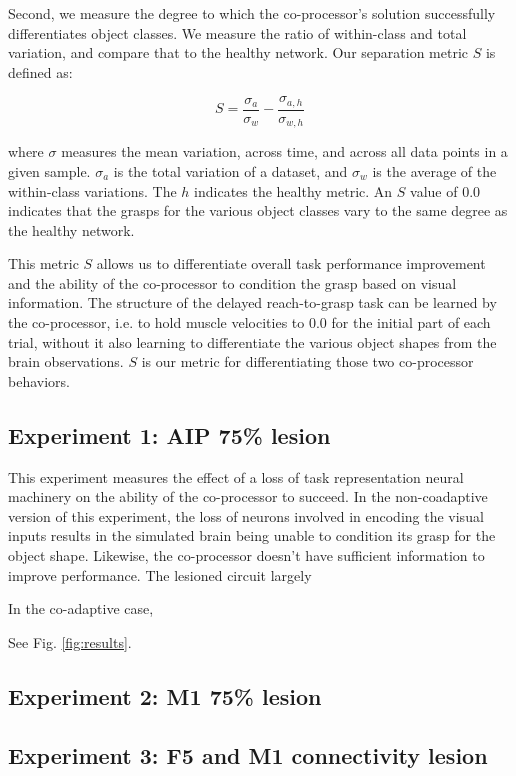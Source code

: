 \documentclass[12pt]{iopart}
\begin{document}
Second, we measure the degree to which the co-processor's solution successfully
differentiates object classes. We measure the ratio of within-class and total variation,
and compare that to the healthy network. Our separation metric $S$ is defined as:

\begin{equation}
	S = \frac{\sigma_{a}}{\sigma_{w}} - \frac{\sigma_{a,h}}{\sigma_{w,h}}
\end{equation}

where $\sigma$ measures the mean variation, across time, and across all data points in
a given sample. $\sigma_{a}$ is the total variation of a dataset, and $\sigma_{w}$
is the average of the within-class variations. The $h$ indicates the healthy
metric. An $S$ value of 0.0 indicates that the grasps for the various object classes
vary to the same degree as the healthy network.

This metric $S$ allows us to differentiate overall task performance improvement
and the ability of the co-processor to condition the grasp based on visual information.
The structure of the delayed reach-to-grasp task can be learned by the co-processor,
i.e. to hold muscle velocities to 0.0 for the initial part of each trial, without it
also learning to differentiate the various object shapes from the brain observations.
$S$ is our metric for differentiating those two co-processor behaviors.

\subsection{Experiment 1: AIP 75\% lesion}
This experiment measures the effect of a loss of task representation neural
machinery on the ability of the co-processor to succeed. In the non-coadaptive
version of this experiment, the loss of neurons involved in encoding the
visual inputs results in the simulated brain being unable to condition its
grasp for the object shape. Likewise, the co-processor doesn't have sufficient
information to improve performance. The lesioned circuit largely 

In the co-adaptive case, 

See Fig. \ref{fig:results}.

\subsection{Experiment 2: M1 75\% lesion}
\subsection{Experiment 3: F5 and M1 connectivity lesion}
\end{document}
